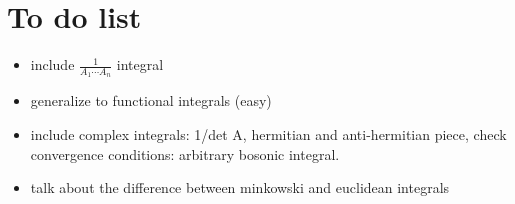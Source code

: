 \documentclass{book}
\begin{document}
\section{To do list} 
\begin{itemize}
\item include $\frac{1}{A_1 \cdots A_n}$ integral
\item generalize to functional integrals (easy)
\item include complex integrals: 1/det A, hermitian and anti-hermitian piece, check convergence conditions: arbitrary bosonic integral.
\item talk about the difference between minkowski and euclidean integrals
\end{itemize}
\end{document}
